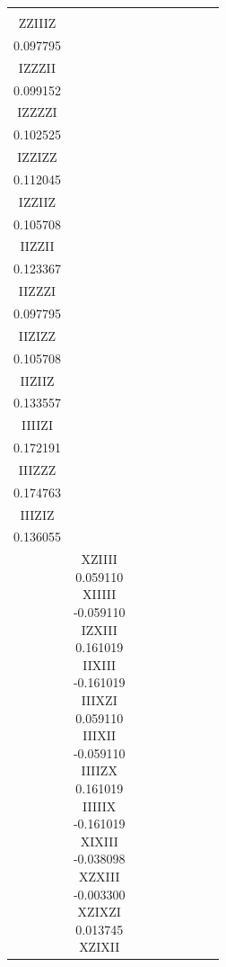 \documentclass[twocolumn]{revtex4-1}
\newcommand{\1}{\mathbbm{1}}
\begin{document}
\begin{longtable}{|c|c|c|c|c|c|c|c|c|}
{{0.102525\\ 
ZZIIIZ\\
0.097795\\ 
IZZZII\\
0.099152\\ 
IZZZZI\\
0.102525\\ 
IZZIZZ\\
0.112045\\ 
IZZIIZ\\
0.105708\\ 
IIZZII\\
0.123367\\ 
IIZZZI\\
0.097795\\ 
IIZIZZ\\
0.105708\\ 
IIZIIZ\\
0.133557\\ 
IIIIZI\\
0.172191\\ 
IIIZZZ\\
0.174763\\ 
IIIZIZ\\
0.136055\\
\vspace{.5\baselineskip}}
}
&
\multicolumn{1}{|c}{
\parbox{1.9cm}{\centering\vspace{.5\baselineskip}
XZIIII\\
0.059110\\ 
XIIIII\\
-0.059110\\ 
IZXIII\\
0.161019\\ 
IIXIII\\
-0.161019\\ 
IIIXZI\\
0.059110\\ 
IIIXII\\
-0.059110\\ 
IIIIZX\\
0.161019\\ 
IIIIIX\\
-0.161019\\ 
XIXIII\\
-0.038098\\ 
XZXIII\\
-0.003300\\ 
XZIXZI\\
0.013745\\ 
XZIXII\\
}}
\end{longtable}
\end{document}
